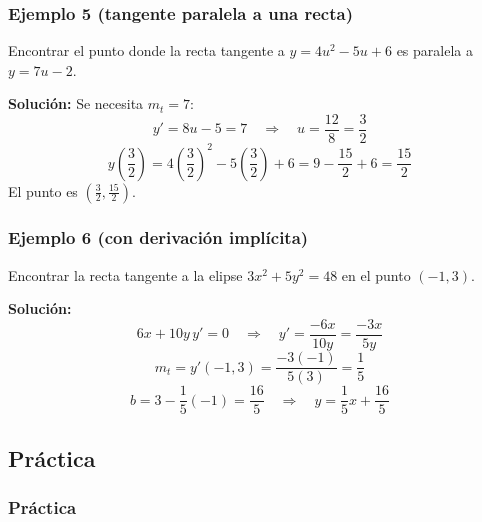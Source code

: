 \documentclass[12pt]{article}
\begin{document}
\subsubsection{Ejemplo 5 (tangente paralela a una recta)}


Encontrar el punto donde la recta tangente a $y = 4u^2 - 5u + 6$ es paralela a $y = 7u - 2$.

\textbf{Solución:} Se necesita $m_t = 7$:
\[
y' = 8u - 5 = 7 \quad \Rightarrow \quad u = \frac{12}{8} = \frac{3}{2}
\]
\[
y\left(\frac{3}{2}\right) = 4\left(\frac{3}{2}\right)^2 - 5\left(\frac{3}{2}\right) + 6 = 9 - \frac{15}{2} + 6 = \frac{15}{2}
\]
El punto es $\left(\frac{3}{2}, \frac{15}{2}\right)$.



\subsubsection{Ejemplo 6 (con derivación implícita)}


Encontrar la recta tangente a la elipse $3x^2 + 5y^2 = 48$ en el punto $(-1, 3)$.

\textbf{Solución:}
\[
6x + 10y\,y' = 0 \quad \Rightarrow \quad y' = \frac{-6x}{10y} = \frac{-3x}{5y}
\]
\[
m_t = y'(-1, 3) = \frac{-3(-1)}{5(3)} = \frac{1}{5}
\]
\[
b = 3 - \frac{1}{5}(-1) = \frac{16}{5} \quad \Rightarrow \quad y = \frac{1}{5}x + \frac{16}{5}
\]



\subsection{Práctica}

\subsubsection{Práctica}
\end{document}
